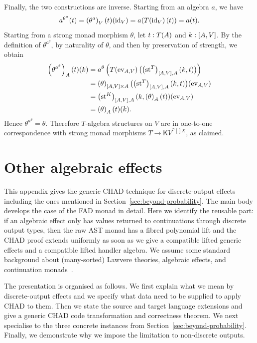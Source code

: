 \documentclass[11pt,a4paper]{article}
\theoremstyle{definition}
\theoremstyle{remark}
\providecommand{\id}{\mathrm{id}}
\providecommand{\cont}{\mathsf{K}}
\providecommand{\str}{\operatorname{st}}
\begin{document}
Finally, the two constructions are inverse.  Starting from an algebra \(a\),
we have
\[
  a^{\theta^{a}}(t)
  =
  \Nat{\theta^{a}}{V}(t)(\id_{V})
  =
  a(\Fun{T}{\id_{V}}(t))
  =
  a(t).
\]
Starting from a strong monad morphism \(\theta\), let
\(t:\Fun{T}{A}\) and \(k:\left[A,V\right]\).  By the definition of
\(\theta^{a^{\theta}}\), by naturality of \(\theta\), and then by preservation
of strength, we obtain
\[
\begin{aligned}
  \Nat{\theta^{a^{\theta}}}{A}(t)(k)
  &=
  a^{\theta}
  \left(
    \Fun{T}{\operatorname{ev}_{A,V}}
    \bigl(
      \Nat{\str^{T}}{\inthom{A}{V},A}(k,t)
    \bigr)
  \right)                                                            \\
  &=
  \Nat{\theta}{\inthom{A}{V}\times A}
  \bigl(
    \Nat{\str^{T}}{\inthom{A}{V},A}(k,t)
  \bigr)
  (\operatorname{ev}_{A,V})                                           \\
  &=
  \Nat{\str^{K}}{\inthom{A}{V},A}
  (k,\Nat{\theta}{A}(t))
  (\operatorname{ev}_{A,V})                                           \\
  &=
  \Nat{\theta}{A}(t)(k).
\end{aligned}
\]
Hence \(\theta^{a^{\theta}}=\theta\).  Therefore \(T\)-algebra structures on
\(V\) are in one-to-one correspondence with strong monad morphisms
\(T\to\cont{V}^{\cat[]{X}}\), as claimed.



\section{Other algebraic effects}
\label{sec:appendix-additional-effects}

This appendix gives the generic CHAD technique for discrete-output effects including the ones mentioned in Section~\ref{sec:beyond-probability}. The main body develops the case of the FAD monad in detail.
Here we identify the reusable part: if an algebraic effect only has values returned to continuations through discrete output types, then
the raw AST monad has a fibred polynomial lift and the CHAD proof extends uniformly as soon as we give a compatible lifted generic effects and a compatible lifted handler algebra.
We assume some standard background about (many-sorted) Lawvere theories, algebraic effects, and continuation monads~\cite{hylandCategoryTheoreticUnderstanding2007,plotkinAlgebraicOperationsGeneric2003,hylandCombiningAlgebraicEffects2007}. 

The presentation is organised as follows. We first explain what we mean by discrete-output effects and we specify what data need to be supplied to apply CHAD to them.
Then we state the source and target language extensions and give a generic CHAD code transformation and correctness theorem.
We next specialise to the three concrete instances from Section~\ref{sec:beyond-probability}.
Finally, we demonstrate why we impose the limitation to non-discrete outputs.
\end{document}
